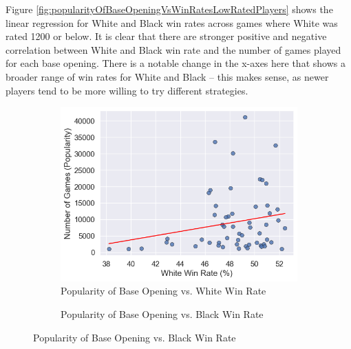 \documentclass[a4paper, 11pt]{article}
\begin{document}
Figure \ref{fig:popularityOfBaseOpeningVsWinRatesLowRatedPlayers} shows the linear regression for White and Black win rates across games where White was rated 1200 or below. It is clear that there are stronger positive and negative correlation between White and Black win rate and the number of games played for each base opening. There is a notable change in the x-axes here that shows a broader range of win rates for White and Black -- this makes sense, as newer players tend to be more willing to try different strategies.

\begin{figure}[H]
    \centering
    \caption{Popularity of Base Opening vs. Win Rates (Players Rated 1200 and Below)}
    \label{fig:popularityOfBaseOpeningVsWinRatesLowRatedPlayers}
    \begin{subfigure}{0.49\textwidth}
        \centering
        \caption{Popularity of Base Opening vs. White Win Rate}
        \label{fig:popularityOfBaseOpeningVsWhiteWinRateLowRatedPlayers}
        \includegraphics[width=\textwidth]{Popularity of Base Opening vs. White Win Rate (Rated 1200-).png}
    \end{subfigure}
    \hfill
    \begin{subfigure}{0.49\textwidth}
        \centering
        \caption{Popularity of Base Opening vs. Black Win Rate}
        \label{fig:popularityOfBaseOpeningVsBlackWinRateLowRatedPlayers}

\end{subfigure}
\end{figure}
\end{document}
